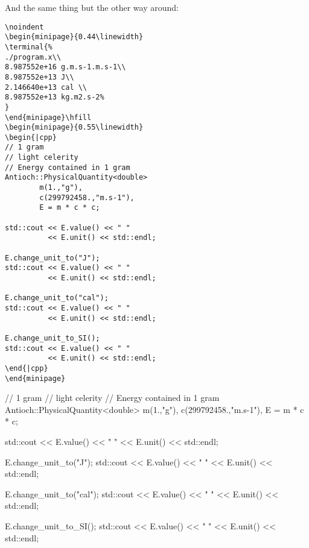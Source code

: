 \documentclass{documentation}
\begin{document}
\begin{minipage}{0.44\linewidth}
\end{minipage}
And the same thing but the other way
around:
\begin{verbatim}
\noindent
\begin{minipage}{0.44\linewidth}
\terminal{%
./program.x\\
8.987552e+16 g.m.s-1.m.s-1\\
8.987552e+13 J\\
2.146640e+13 cal \\
8.987552e+13 kg.m2.s-2%
}
\end{minipage}\hfill
\begin{minipage}{0.55\linewidth}
\begin{|cpp} 
// 1 gram 
// light celerity
// Energy contained in 1 gram
Antioch::PhysicalQuantity<double> 
        m(1.,"g"),
        c(299792458.,"m.s-1"),
        E = m * c * c; 

std::cout << E.value() << " " 
          << E.unit() << std::endl;

E.change_unit_to("J");
std::cout << E.value() << " " 
          << E.unit() << std::endl;

E.change_unit_to("cal");
std::cout << E.value() << " " 
          << E.unit() << std::endl;

E.change_unit_to_SI();
std::cout << E.value() << " " 
          << E.unit() << std::endl;
\end{|cpp}
\end{minipage}
\end{verbatim}
\noindent
\begin{minipage}{0.44\linewidth}
\end{minipage}\hfill
\begin{minipage}{0.55\linewidth}
\begin{|cpp} 
// 1 gram 
// light celerity
// Energy contained in 1 gram
Antioch::PhysicalQuantity<double> 
        m(1.,"g"),
        c(299792458.,"m.s-1"),
        E = m * c * c; 

std::cout << E.value() << " " 
          << E.unit() << std::endl;

E.change_unit_to("J");
std::cout << E.value() << " " 
          << E.unit() << std::endl;

E.change_unit_to("cal");
std::cout << E.value() << " " 
          << E.unit() << std::endl;

E.change_unit_to_SI();
std::cout << E.value() << " " 
          << E.unit() << std::endl;
\end{|cpp}
\end{minipage}
\end{document}

